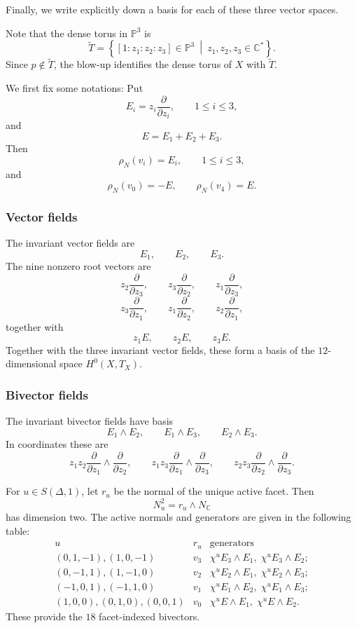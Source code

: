 \documentclass[colorlinks,11pt,reqno]{amsart}
\theoremstyle{definition}
\theoremstyle{remark}
\numberwithin{equation}{section}
\numberwithin{equation}{section}
\newcommand{\CC}{\mathbb{C}}
\begin{document}
Finally, we write explicitly down a basis for each of these three vector spaces.

Note that the dense torus in \(\mathbb P^3\) is
\[
\widetilde T =
\left\{
[1:z_1:z_2:z_3]\in\mathbb P^3
\ \middle|\
z_1,z_2,z_3\in\CC^*
\right\}.
\]
Since \(p\notin\widetilde T\), the blow-up identifies the dense torus of \(X\) with \(\widetilde T\).

We first fix some notations: Put
\[
E_i=z_i\frac{\partial}{\partial z_i}, \qquad1\leq i\leq3,
\]
and
\[
E=E_1+E_2+E_3.
\]
Then
\[
\rho_N(v_i)=E_i,\qquad1\leq i\leq3,
\]
and
\[
\rho_N(v_0)=-E,\qquad \rho_N(v_4)=E.
\]

\subsubsection*{Vector fields}

The invariant vector fields are
\[
E_1,\qquad E_2,\qquad E_3.
\]
The nine nonzero root vectors are
\[
z_2\frac{\partial}{\partial z_3},\qquad
z_3\frac{\partial}{\partial z_2},\qquad
z_1\frac{\partial}{\partial z_3},
\]
\[
z_3\frac{\partial}{\partial z_1},\qquad
z_1\frac{\partial}{\partial z_2},\qquad
z_2\frac{\partial}{\partial z_1},
\]
together with
\[
z_1E,\qquad z_2E,\qquad z_3E.
\]
Together with the three invariant vector fields, these form a basis
of the \(12\)-dimensional space \(H^0(X,T_X)\).

\subsubsection*{Bivector fields}

The invariant bivector fields have basis
\[
E_1\wedge E_2,\qquad E_1\wedge E_3,\qquad E_2\wedge E_3.
\]
In coordinates these are
\[
z_1z_2 \frac{\partial}{\partial z_1} \wedge \frac{\partial}{\partial z_2},
\qquad
z_1z_3 \frac{\partial}{\partial z_1} \wedge \frac{\partial}{\partial z_3},
\qquad
z_2z_3 \frac{\partial}{\partial z_2} \wedge \frac{\partial}{\partial z_3}.
\]

For \(u\in S(\Delta,1)\), let \(r_u\) be the normal of the unique active facet. Then
\[
N_u^2=r_u\wedge N_{\CC}
\]
has dimension two. The active normals and generators are given in the following table:
\[
\begin{array}{c|c|c}
u&r_u& \text{generators} \\
\hline
(0,1,-1),(1,0,-1)&v_3& \chi^uE_3\wedge E_1,\; \chi^uE_3\wedge E_2; \\
(0,-1,1),(1,-1,0)&v_2& \chi^uE_2\wedge E_1,\; \chi^uE_2\wedge E_3; \\
(-1,0,1),(-1,1,0)&v_1& \chi^uE_1\wedge E_2,\; \chi^uE_1\wedge E_3; \\
(1,0,0),(0,1,0),(0,0,1)& v_0 & \chi^uE\wedge E_1,\; \chi^uE\wedge E_2.
\end{array}
\]
These provide the \(18\) facet-indexed bivectors.
\end{document}
